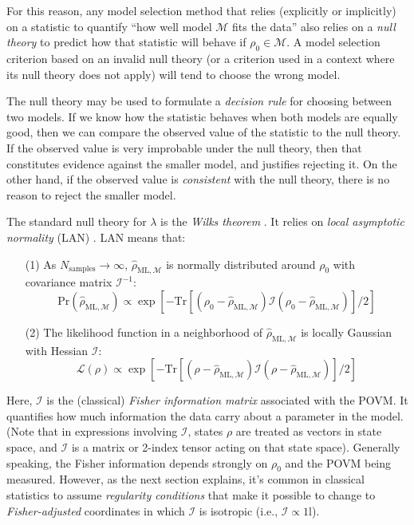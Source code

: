 \documentclass[aps,pra, twocolumn]{revtex4-1}
\newcommand{\M}{\mathcal{M}}
\newcommand{\Id}{\mathbb{I}}
\def\Id{1\!\mathrm{l}}
\newcommand{\Fi}{\mathcal{I}}
\newcommand{\rhohat}{\hat{\rho}}
\newcommand{\rhoML}[1]{\rhohat_{\scriptscriptstyle{\mathrm{ML},#1}}}
\begin{document}
For this reason, any model selection method that relies (explicitly or implicitly) on a statistic to quantify ``how well model $\M$ fits the data'' also relies on a \emph{null theory} to predict how that statistic will behave if $\rho_{0} \in \M$.  A model selection criterion based on an invalid null theory (or a criterion used in a context where its null theory does not apply) will tend to choose the wrong model.

The null theory may be used to formulate a \emph{decision rule} for choosing between two models. If we know how the statistic behaves when both models are equally good, then we can compare the observed value of the statistic to the null theory. If the observed value is very improbable under the null theory, then that constitutes evidence against the smaller model, and justifies rejecting it. On the other hand, if the observed value is \emph{consistent} with the null theory, there is no reason to reject the smaller model.

The standard null theory for $\lambda$ is the \emph{Wilks theorem} \cite{Wilks1938}. It relies on \emph{local asymptotic normality} (LAN) \cite{LeCam1970, LeCam1956}. LAN means that:
\begin{itemize}[nosep]
\item[(1)] As $N_{\mathrm{samples}}\rightarrow \infty$,  $\rhoML{\M}$ is normally distributed around $\rho_{0}$ with covariance matrix $\Fi^{-1}$:
\begin{equation}
\label{eq:landist}
\mathrm{Pr}(\rhoML{\M}) \propto \exp\left[-\mathrm{Tr}[(\rho_{0} - \rhoML{\M})\mathcal{I}(\rho_{0} -\rhoML{\M})]/2\right]
\end{equation}
\item[(2)]The likelihood function in a neighborhood of $\rhoML{\M}$ is locally Gaussian with Hessian $\Fi$:
\begin{equation}
\label{eq:lanl}
\mathcal{L}(\rho) \propto \exp\left[-\mathrm{Tr}[(\rho - \rhoML{\M})\mathcal{I}(\rho - \rhoML{\M})]/2\right]
\end{equation}
\end{itemize}
Here, $\Fi$ is the (classical) \emph{Fisher information matrix} associated with the POVM. It quantifies how much information the data carry about a parameter in the model.  (Note that in expressions involving $\mathcal{I}$, states $\rho$ are treated as vectors in state space, and $\mathcal{I}$ is a matrix or 2-index tensor acting on that state space). Generally speaking, the Fisher information depends strongly on $\rho_{0}$ and the POVM being measured. However, as the next section explains, it's common in classical statistics to assume \emph{regularity conditions} that make it possible to change to \emph{Fisher-adjusted} coordinates in which $\mathcal{I}$ is isotropic (i.e., $\mathcal{I} \propto \Id$).
\end{document}
